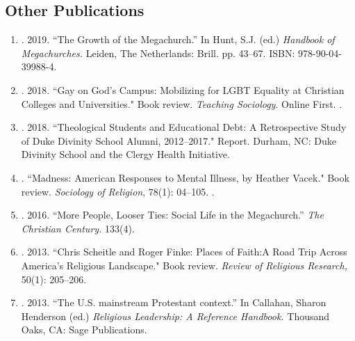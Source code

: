 \subsection*{Other Publications}
\begin{enumerate}
\item \Tian. 2019. ``The Growth of the Megachurch.'' In Hunt, S.J. (ed.) \emph{Handbook of Megachurches.} Leiden, The Netherlands: Brill. pp. 43--67. ISBN: 978-90-04-39988-4.
\item \Tian. 2018. ``Gay on God’s Campus: Mobilizing for LGBT Equality at Christian Colleges and Universities." Book review. \emph{Teaching Sociology}. Online First. .
\item \Tian. 2018. ``Theological Students and Educational Debt: A Retrospective Study of Duke Divinity School Alumni, 2012--2017." Report. Durham, NC: Duke Divinity School and the Clergy Health Initiative.
\item {}. ``Madness: American Responses to Mental Illness, by Heather Vacek." Book review. \emph{Sociology of Religion}, 78(1): 04--105. .
\item \Tian. 2016. ``More People, Looser Ties: Social Life in the Megachurch.'' \emph{The Christian Century.} 133(4).
\item \Tian. 2013. ``Chris Scheitle and Roger Finke: Places of Faith:A Road Trip Across America's Religious Landscape." Book review.  \emph{Review of Religious Research,} 50(1): 205--206.
\item \Tian. 2013. ``The U.S. mainstream Protestant context.'' In Callahan, Sharon Henderson (ed.) \emph{Religious Leadership: A Reference Handbook.} Thousand Oaks, CA: Sage Publications.
\end{enumerate}